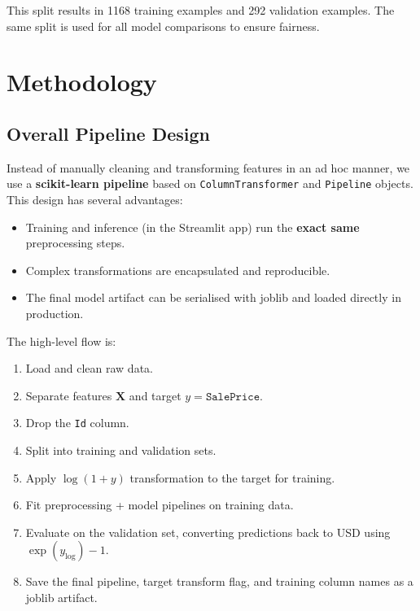 \documentclass[11pt,a4paper]{article}
\begin{document}
This split results in 1168 training examples and 292 validation examples.
The same split is used for all model comparisons to ensure fairness.

\section{Methodology}

\subsection{Overall Pipeline Design}

Instead of manually cleaning and transforming features in an ad hoc manner, we use a \textbf{scikit-learn pipeline} based on \texttt{ColumnTransformer} and \texttt{Pipeline} objects.
This design has several advantages:

\begin{itemize}[leftmargin=*]
    \item Training and inference (in the Streamlit app) run the \textbf{exact same} preprocessing steps.
    \item Complex transformations are encapsulated and reproducible.
    \item The final model artifact can be serialised with joblib and loaded directly in production.
\end{itemize}

The high-level flow is:

\begin{enumerate}[leftmargin=*]
    \item Load and clean raw data.
    \item Separate features \(\mathbf{X}\) and target \(y = \texttt{SalePrice}\).
    \item Drop the \texttt{Id} column.
    \item Split into training and validation sets.
    \item Apply \(\log(1 + y)\) transformation to the target for training.
    \item Fit preprocessing + model pipelines on training data.
    \item Evaluate on the validation set, converting predictions back to USD using \(\exp(y_{\log}) - 1\).
    \item Save the final pipeline, target transform flag, and training column names as a joblib artifact.
\end{enumerate}
\end{document}
